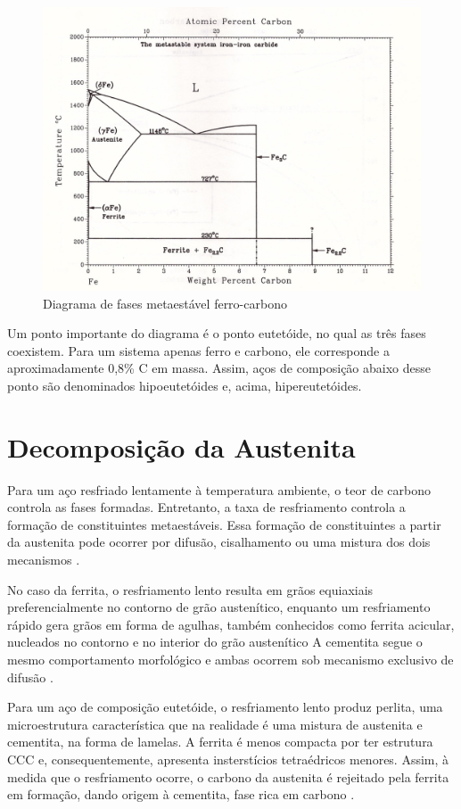 \documentclass[brazil,tese,epusp]{usp}
\begin{document}
\begin{figure}[ht!]
  \includegraphics[width=.8\textwidth,angle=180]{img/Fe-C_meta.jpg}
  \caption{Diagrama de fases metaestável ferro-carbono \cite{Massalski1996v1}}
  \label{fig:diagrama_fe-c_meta}
\end{figure}

Um ponto importante do diagrama é o ponto eutetóide, no qual as três fases coexistem. Para um sistema apenas ferro e carbono, ele corresponde a aproximadamente 0,8\% C em massa. Assim, aços de composição abaixo desse ponto são denominados hipoeutetóides e, acima, hipereutetóides.

\section{Decomposição da Austenita}

Para um aço resfriado lentamente à temperatura ambiente, o teor de carbono controla as fases formadas. Entretanto, a taxa de resfriamento controla a formação de constituintes metaestáveis. Essa formação de constituintes a partir da austenita pode ocorrer por difusão, cisalhamento ou uma mistura dos dois mecanismos \cite{Honeycombe1982}.

No caso da ferrita, o resfriamento lento resulta em grãos equiaxiais preferencialmente no contorno de grão austenítico, enquanto um resfriamento rápido gera grãos em forma de agulhas, também conhecidos como ferrita acicular, nucleados no contorno e no interior do grão austenítico  \cite{Silva2010} %
A cementita segue o mesmo comportamento morfológico e ambas ocorrem sob mecanismo exclusivo de difusão \cite{Honeycombe1982}.

Para um aço de composição eutetóide, o resfriamento lento produz perlita, uma microestrutura característica que na realidade é uma mistura de austenita e cementita, na forma de lamelas. A ferrita é menos compacta por ter estrutura CCC e, consequentemente, apresenta insterstícios tetraédricos menores. Assim, à medida que o resfriamento ocorre, o carbono da austenita é rejeitado pela ferrita em formação, dando origem à cementita, fase rica em carbono \cite{Silva2010}.
\end{document}
